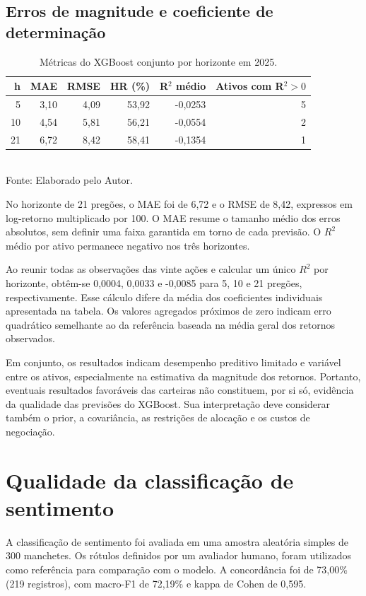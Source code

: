 \subsection*{Erros de magnitude e coeficiente de determinação}
\begin{table}[H]
\centering
\caption{Métricas do XGBoost conjunto por horizonte em 2025.}
\label{tab:metricas_pool_horizontes}
{\footnotesize
\begin{tabular}{@{}rrrrrr@{}}
\hline
h & MAE & RMSE & HR (\%) & R$^2$ médio & Ativos com R$^2>0$ \\ \hline
5 & 3,10 & 4,09 & 53,92 & -0,0253 & 5 \\
10 & 4,54 & 5,81 & 56,21 & -0,0554 & 2 \\
21 & 6,72 & 8,42 & 58,41 & -0,1354 & 1 \\
\hline
\end{tabular}}
\par{}
\\Fonte: Elaborado pelo Autor.
\end{table}
No horizonte de 21 pregões, o MAE foi de 6,72 e o RMSE de
8,42, expressos em log-retorno multiplicado por 100. O MAE
resume o tamanho médio dos erros absolutos, sem definir uma
faixa garantida em torno de cada previsão. O $R^2$ médio por
ativo permanece negativo nos três horizontes.

Ao reunir todas as observações das vinte ações e calcular
um único $R^2$ por horizonte, obtêm-se 0,0004, 0,0033 e
-0,0085 para 5, 10 e 21 pregões, respectivamente. Esse cálculo
difere da média dos coeficientes individuais apresentada na
tabela. Os valores agregados próximos de zero indicam erro
quadrático semelhante ao da referência baseada na média
geral dos retornos observados.

Em conjunto, os resultados indicam desempenho preditivo
limitado e variável entre os ativos, especialmente na
estimativa da magnitude dos retornos. Portanto, eventuais
resultados favoráveis das carteiras não constituem, por si
só, evidência da qualidade das previsões do XGBoost. Sua
interpretação deve considerar também o prior, a covariância,
as restrições de alocação e os custos de negociação.

\section{Qualidade da classificação de sentimento}

A classificação de sentimento foi avaliada em uma amostra
aleatória simples de 300 manchetes. Os rótulos definidos por
um avaliador humano, foram utilizados como referência para comparação
com o modelo. A concordância foi de 73,00\% (219 registros),
com macro-F1 de 72,19\% e kappa de Cohen de 0,595.

